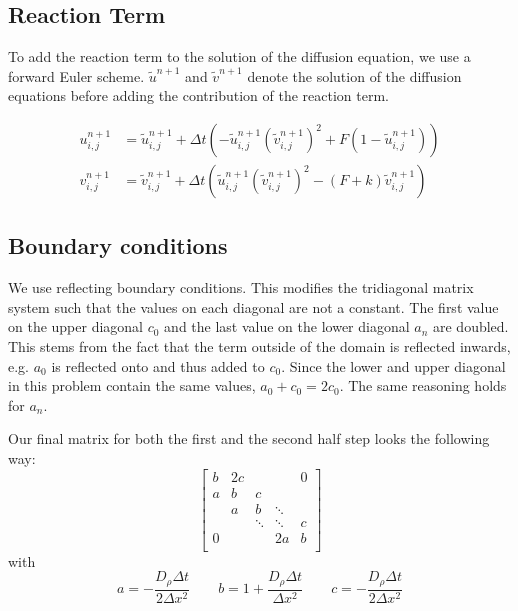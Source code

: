 \documentclass[a4paper]{article}
\begin{document}
\subsection{Reaction Term}
To add the reaction term to the solution of the diffusion equation, we use a forward Euler scheme.
$\tilde u^{n+1}$ and $\tilde v^{n+1}$ denote the solution of the diffusion equations before adding the contribution of the reaction term.

\begin{align}
	u_{i,j}^{n+1} &= \tilde u_{i,j}^{n+1} + \Delta t \left( - \tilde u_{i,j}^{n+1} (\tilde v_{i,j}^{n+1})^2 + F ( 1- \tilde u_{i,j}^{n+1} ) \right) \\
	v_{i,j}^{n+1} &= \tilde v_{i,j}^{n+1} + \Delta t \left( \tilde u_{i,j}^{n+1} (\tilde v_{i,j}^{n+1})^2 - (F+k) \tilde v_{i,j}^{n+1} \right)
\end{align}


\subsection{Boundary conditions}
We use reflecting boundary conditions.
This modifies the tridiagonal matrix system such that the values on each diagonal are not a constant.
The first value on the upper diagonal $c_0$ and the last value on the lower diagonal $a_n$ are doubled.
This stems from the fact that the term outside of the domain is reflected inwards, e.g. $a_0$ is reflected onto and thus added to $c_0$.
Since the lower and upper diagonal in this problem contain the same values, $a_0 + c_0 = 2 c_0$.
The same reasoning holds for $a_n$.

Our final matrix for both the first and the second half step looks the following way:
\begin{equation}
\begin{bmatrix}
   {b} & {2c} & {   } & {   } & { 0 } \\
   {a} & {b} & {c} & {   } & {   } \\
   {   } & {a} & {b} & \ddots & {   } \\
   {   } & {   } & \ddots & \ddots & {c}\\
   { 0 } & {   } & {   } & {2a} & {b}\\
\end{bmatrix}
\end{equation}
with
\begin{equation}
	a = -\frac{D_\rho \Delta t}{2 \Delta x^2} \qquad b = 1 + \frac{D_\rho \Delta t}{\Delta x^2} \qquad c = -\frac{D_\rho \Delta t}{2 \Delta x^2}
\end{equation}
\end{document}
